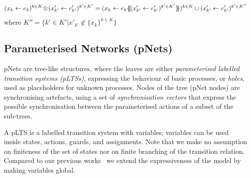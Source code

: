 \documentclass{lmcs}
\newcommand{\ERIC}[1]{\textcolor{blue}{#1}}
\newcommand{\LUDO}[1]{\textcolor{darkgreen}{#1}}
\newcommand{\shortotimes}{\!\otimes\!}
\begin{document}
\[(x_{k}\gets e_{k})^{k\in K}\shortotimes (x'_{k'}\gets e'_{k'})^{k'\in K'} =  
(x_{k}\gets e_{k}\subst{(x'_{k'}\gets e'_{k'})^{k'\in K'}})^{k\in K} \cup (x'_{k'}\gets e'_{k'})^{k'\in K''}\]
where $K''=\{k'\in K'|x'_{k'}\not\in\{x_k\}^{k\in K}\}$
%
%
% 

\subsection{Parameterised Networks (pNets)}
\label{section:pnets}

pNets are tree-like structures, where the leaves are either \emph{parameterised labelled transition systems (pLTSs)}, expressing the
behaviour of basic processes, or \emph{holes}, used as placeholders
for unknown processes. 
Nodes of the tree (pNet nodes) are synchronising artefacts, using a
set of \emph{synchronisation vectors} that express the possible
synchronisation between the parameterised actions of a subset of the sub-trees.



A pLTS is a labelled transition system with variables; variables can be
used inside states, actions, guards, and
assignments. 
Note that we make no assumption on finiteness of the set of states nor
on finite branching of the transition relation. Compared to our previous works~\cite{henrio:Forte2016,AmeurBoulifa2017} we extend the expressiveness of the model by making variables global.
\end{document}
